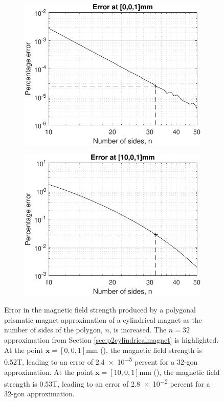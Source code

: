 \begin{figure}
	\centering
	\begin{subfigure}{0.6\textwidth}
		\centering
		\includegraphics[width=\textwidth]{p2/p2FIG8a}
		\caption{}\label{fig:p2polycylapproxa}
	\end{subfigure}
	
	\begin{subfigure}{0.6\textwidth}
		\centering
		\includegraphics[width=\textwidth]{p2/p2FIG8b}
		\caption{}\label{fig:p2polycylapproxb}
	\end{subfigure}
	\caption{Error in the magnetic field strength produced by a polygonal prismatic magnet approximation of a cylindrical magnet as the number of sides of the polygon, \(n\), is increased. The \(n = 32\) approximation from Section \ref{sec:p2cylindricalmagnet} is highlighted. At the point \(\mathbf{x} = \left[0,0,1\right]\)\si{\milli\metre} (), the magnetic field strength is 0.52\si{\tesla}, leading to an error of \num{2.4e-5} percent for a 32-gon approximation. At the point \(\mathbf{x} = \left[10,0,1\right]\)\si{\milli\metre} (), the magnetic field strength is 0.53\si{\tesla}, leading to an error of \num{2.8e-2} percent for a 32-gon approximation.}
	\label{fig:p2polycylapprox}
\end{figure}

